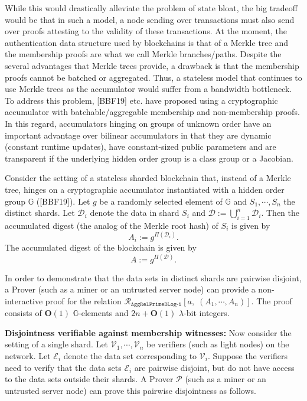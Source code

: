 \documentclass[11pt, lettersize, notitlepage, leqno, footskip=0.6cm]{article}
\newcommand{\ttt}{\texttt}
\newcommand{\bG}{\mathbb{G}}
\newcommand{\mc}{\mathcal}
\newcommand{\mb}{\mathbb}
\newcommand{\mbf}{\mathbf}
\newcommand{\lam}{\lambda}
\newcommand{\bO}{\mbf{O}}
\newcommand{\mP}{\mc{P}}
\newcommand{\V}{\mc{V}}
\newcommand{\vs}{\vspace{-0.15cm}}
\newcommand{\noin}{\noindent}
\numberwithin{equation}{section}
\begin{document}
While this would drastically alleviate the problem of state bloat, the big tradeoff would be that in such a model, a node sending over transactions must also send over proofs attesting to the validity of these transactions. At the moment, the authentication data structure used by blockchains is that of a Merkle tree and the membership proofs are what we call Merkle branches/paths. Despite the several advantages that Merkle trees provide, a drawback is that the membership proofs cannot be batched or aggregated. Thus, a stateless model that continues to use Merkle trees as the accumulator would suffer from a bandwidth bottleneck. To address this problem, [BBF19] etc. have proposed using a cryptographic accumulator with batchable/aggregable membership and non-membership proofs. In this regard, accumulators hinging on groups of unknown order have an important advantage over bilinear accumulators in that they are dynamic (constant runtime updates), have constant-sized public parameters and are transparent if the underlying hidden order group is a class group or a Jacobian.

Consider the setting of a stateless sharded blockchain that, instead of a Merkle tree, hinges on a cryptographic accumulator instantiated with a hidden order group $\mb{G}$ ([BBF19]). Let $g$ be a randomly selected element of $\mb{G}$ and $S_1,\cdots, S_n$ the distinct shards. Let $\mc{D}_i$ denote the data in shard $S_i$ and $\mc{D}:= \bigcup\limits_{i=1}^n \mc{D}_i$. Then the accumulated digest (the analog of the Merkle root hash) of $S_i$ is given by \vs $$A_i:= g^{\Pi(\mc{D}_i)}.$$  The accumulated digest of the blockchain is given by \vs $$A:= g^{\Pi(\mc{D})}.$$

In order to demonstrate that the data sets in distinct shards are pairwise disjoint, a Prover (such as a miner or an untrusted server node) can provide a non-interactive proof for the relation $\mc{R}_{\ttt{AggRelPrimeDLog-1}}[a,\;(A_1,\cdots,A_n) ].$ The proof consists of $\bO(1)$ $\bG$-elements and $2n+\bO(1)$ $\lam$-bit integers.


\bigskip

\noin \textbf{Disjointness verifiable against membership witnesses:} Now consider the setting of a single shard. Let $\V_1,\cdots,\V_n$ be verifiers (such as light nodes) on the network. Let $\mc{E}_i$ denote the data set corresponding to $\V_i$. Suppose the verifiers need to verify that the data sets $\mc{E}_i$ are pairwise disjoint, but do not have access to the data sets outside their shards. A Prover $\mP$ (such as a miner or an untrusted server node) can prove this pairwise disjointness as follows.\vspace{0.1cm}
\end{document}
